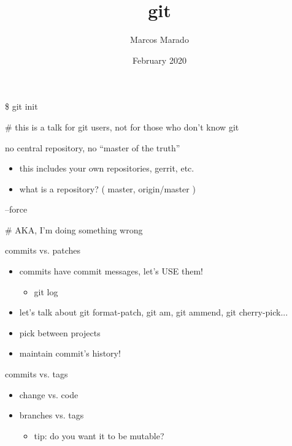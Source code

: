 \documentclass[landscape]{slides}
\author{Marcos Marado}
\title{git}
\date{February 2020}
\begin{document}
\begin{slide}
\maketitle
\end{slide}

\begin{slide}
\$ git init

\# this is a talk for git users, not for those who don't know git
\end{slide}

\begin{slide}
no central repository, no ``master of the truth''

\begin{itemize}
\item{} this includes your own repositories, gerrit, etc.
\item{} what is a repository? ( master, origin/master )
\end{itemize}
\end{slide}

\begin{slide}
--force

\# AKA, I'm doing something wrong
\end{slide}

\begin{slide}
commits vs. patches

\begin{itemize}
\item{} commits have commit messages, let's USE them!
	\begin{itemize}
	\item{} git log
	\end{itemize}
\item{} let's talk about git format-patch, git am, git ammend, git cherry-pick...
\item{} pick between projects
\item{} maintain commit's history!
\end{itemize}
\end{slide}

\begin{slide}
commits vs. tags

\begin{itemize}
\item{} change vs. code
\item{} branches vs. tags
\begin{itemize}
\item{} tip: do you want it to be mutable?
\end{itemize}
\end{itemize}
\end{slide}
\end{document}
